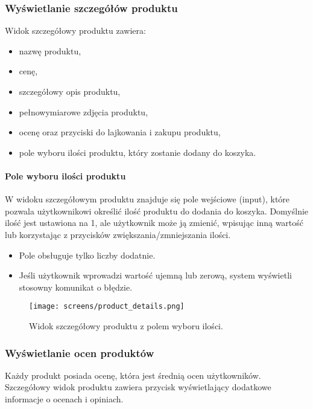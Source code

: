 \documentclass[12pt,a4paper,oneside]{article}
\theoremstyle{definition}
\numberwithin{equation}{section}
\begin{document}
\subsubsection{Wyświetlanie szczegółów produktu}
Widok szczegółowy produktu zawiera:
\begin{itemize}
    \item nazwę produktu,
    \item cenę,
    \item szczegółowy opis produktu,
    \item pełnowymiarowe zdjęcia produktu,
    \item ocenę oraz przyciski do lajkowania i zakupu produktu,
    \item pole wyboru ilości produktu, który zostanie dodany do koszyka.
\end{itemize}

\paragraph{Pole wyboru ilości produktu}
W widoku szczegółowym produktu znajduje się pole wejściowe (input), które pozwala użytkownikowi określić ilość produktu do dodania do koszyka. Domyślnie ilość jest ustawiona na 1, ale użytkownik może ją zmienić, wpisując inną wartość lub korzystając z przycisków zwiększania/zmniejszania ilości.

\begin{itemize}
    \item Pole obsługuje tylko liczby dodatnie.
    \item Jeśli użytkownik wprowadzi wartość ujemną lub zerową, system wyświetli stosowny komunikat o błędzie.
\end{itemize}

\begin{figure}[H]
    \centering
    \texttt{[image: screens/product\_details.png]}
    \caption{Widok szczegółowy produktu z polem wyboru ilości.}
    \label{fig:product_details}
\end{figure}







\newpage
\subsubsection{Wyświetlanie ocen produktów}
Każdy produkt posiada ocenę, która jest średnią ocen użytkowników. Szczegółowy widok produktu zawiera przycisk wyświetlający dodatkowe informacje o ocenach i opiniach.
\end{document}
